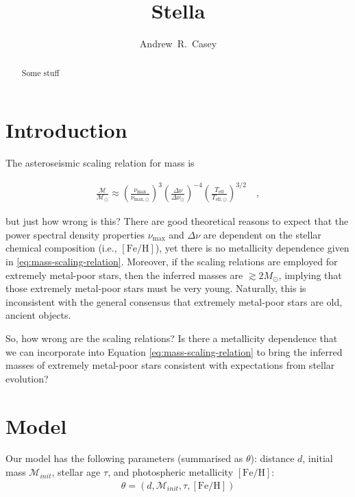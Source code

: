 \documentclass[preprint]{aastex}
\newcommand{\teff}{T_{\mathrm{eff}}}
\newcommand{\teffSolar}{T_{\mathrm{eff},\odot}}
\newcommand{\feh}{[\mathrm{Fe/H}]}
\newcommand{\mass}{\mathcal{M}}
\newcommand{\massSolar}{\mass_\odot}
\newcommand{\numax}{\nu_\mathrm{max}}
\newcommand{\numaxSolar}{\nu_{\mathrm{max},\odot}}
\newcommand{\deltanu}{\Delta\nu}
\newcommand{\deltanuSolar}{\deltanu_\odot}
\newcommand{\age}{\tau}
\begin{document}
\title{Stella}

\author{
  Andrew~R.~Casey
}


\begin{abstract}
  Some stuff
\end{abstract}


\keywords{stars: fundamental parameters --- stars: abundances
}

\section{Introduction} 
\label{sec:introduction}


The asteroseismic scaling relation for mass is

\begin{eqnarray}\label{eq:mass-scaling-relation}
    \frac{\mass}{\massSolar} \approx \left(\frac{\numax}{\numaxSolar}\right)^{3}\left(\frac{\deltanu}{\deltanuSolar}\right)^{-4}\left(\frac{\teff}{\teffSolar}\right)^{3/2}  \quad ,
\end{eqnarray}

\noindent{}but just how wrong is this? There are good theoretical reasons to expect that the power spectral density properties $\numax$ and $\deltanu$ are dependent on the stellar chemical composition (i.e., $\feh$), yet there is no metallicity dependence given in \ref{eq:mass-scaling-relation}.  Moreover, if the scaling relations are employed for extremely metal-poor stars, then the inferred masses are $\gtrsim2M_\odot$, implying that those extremely metal-poor stars must be very young. Naturally, this is inconsistent with the general consensus that extremely metal-poor stars are old, ancient objects.

So, how wrong are the scaling relations? Is there a metallicity dependence that we can incorporate into Equation \ref{eq:mass-scaling-relation} to bring the inferred masses of extremely metal-poor stars consistent with expectations from stellar evolution? 

\section{Model}
\label{sec:model}


Our model has the following parameters (summarised as $\theta$): distance $d$, initial mass $\mass_{init}$, stellar age $\age$, and photospheric metallicity $\feh$:
\begin{eqnarray}\label{eq:model-parameters}
    \theta = (d, \mass_{init}, \tau, \feh)
\end{eqnarray}
\end{document}
